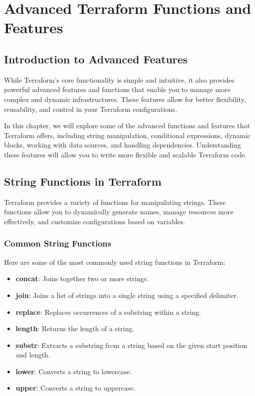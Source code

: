 \chapter{Advanced Terraform Functions and Features}
\sloppy

\section{Introduction to Advanced Features}

While Terraform's core functionality is simple and intuitive, it also provides powerful advanced features and functions that enable you to manage more complex and dynamic infrastructures. These features allow for better flexibility, reusability, and control in your Terraform configurations.

In this chapter, we will explore some of the advanced functions and features that Terraform offers, including string manipulation, conditional expressions, dynamic blocks, working with data sources, and handling dependencies. Understanding these features will allow you to write more flexible and scalable Terraform code.

\section{String Functions in Terraform}

Terraform provides a variety of functions for manipulating strings. These functions allow you to dynamically generate names, manage resources more effectively, and customize configurations based on variables.

\subsection{Common String Functions}

Here are some of the most commonly used string functions in Terraform:

\begin{itemize}
  \item \textbf{concat}: Joins together two or more strings.
  \item \textbf{join}: Joins a list of strings into a single string using a specified delimiter.
  \item \textbf{replace}: Replaces occurrences of a substring within a string.
  \item \textbf{length}: Returns the length of a string.
  \item \textbf{substr}: Extracts a substring from a string based on the given start position and length.
  \item \textbf{lower}: Converts a string to lowercase.
  \item \textbf{upper}: Converts a string to uppercase.
\end{itemize}

